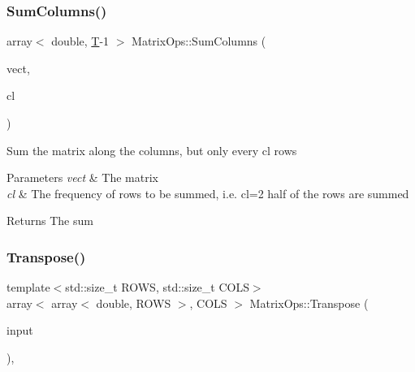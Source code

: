 \subsubsection{\texorpdfstring{Sum\+Columns()}{SumColumns()}}
{\footnotesize\ttfamily array$<$ double, \mbox{\hyperlink{_constants_8h_a6108cec236ef7a2e1d3259931de87186}{T}}-\/1 $>$ Matrix\+Ops\+::\+Sum\+Columns (\begin{DoxyParamCaption}\item[{array$<$ array$<$ double, \mbox{\hyperlink{_constants_8h_a6108cec236ef7a2e1d3259931de87186}{T}}-\/1 $>$, \mbox{\hyperlink{_constants_8h_a12148c0e36153a905f4f6ef1afdbb27e}{C\+L\+A\+S\+S\+ES}} $\ast$\mbox{\hyperlink{_constants_8h_aefc2426e4681da445c7793c98a83c532}{N\+E\+U\+R\+O\+N\+S\+\_\+\+IN}} $>$ \&}]{vect,  }\item[{const short}]{cl }\end{DoxyParamCaption})\hspace{0.3cm}{\ttfamily [static]}}

Sum the matrix along the columns, but only every cl rows 
\begin{DoxyParams}{Parameters}
{\em vect} & The matrix \\
\hline
{\em cl} & The frequency of rows to be summed, i.\+e. cl=2 half of the rows are summed \\
\hline
\end{DoxyParams}
\begin{DoxyReturn}{Returns}
The sum 
\end{DoxyReturn}
\mbox{\label{class_matrix_ops_a8f4af29be905aeb6c49c1145603b3197}} 
\subsubsection{\texorpdfstring{Transpose()}{Transpose()}}
{\footnotesize\ttfamily template$<$std\+::size\+\_\+t R\+O\+WS, std\+::size\+\_\+t C\+O\+LS$>$ \\
array$<$ array$<$ double, R\+O\+WS $>$, C\+O\+LS $>$ Matrix\+Ops\+::\+Transpose (\begin{DoxyParamCaption}\item[{array$<$ array$<$ double, C\+O\+LS $>$, R\+O\+WS $>$ \&}]{input }\end{DoxyParamCaption})\hspace{0.3cm}{\ttfamily [inline]}, {\ttfamily [static]}}

